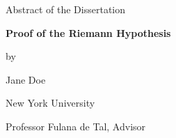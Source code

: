 \documentclass[12pt,letterpaper]{article}
\newcommand{\thesistitle}{Proof of the Riemann Hypothesis}
\newcommand{\thesisauthor}{Jane Doe}
\newcommand{\thesisadvisor}{Professor Fulana de Tal}
\begin{document}
  \begin{center}
    Abstract of the Dissertation\bigskip

    \textbf{\thesistitle}\bigskip

    by\bigskip

    \thesisauthor\bigskip

    New York University\bigskip

    \thesisadvisor, Advisor
  \end{center}
\bigskip


\end{document}
